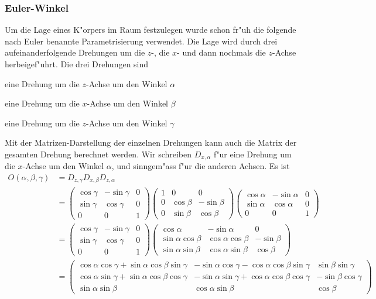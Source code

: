 \subsubsection{Euler-Winkel}
Um die Lage eines K"orpers im Raum festzulegen wurde schon fr"uh
die folgende nach Euler benannte  Parametrisierung verwendet.
Die Lage wird durch drei aufeinanderfolgende Drehungen um die $z$-,
die $x$- und dann nochmals die $z$-Achse herbeigef"uhrt. Die drei
Drehungen sind
\begin{compactenum}
\item eine Drehung um die $z$-Achse um den Winkel $\alpha$
\item eine Drehung um die $x$-Achse um den Winkel $\beta$
\item eine Drehung um die $z$-Achse um den Winkel $\gamma$
\end{compactenum}
Mit der Matrizen-Darstellung der einzelnen Drehungen kann auch
die Matrix der gesamten Drehung berechnet werden. Wir schreiben
$D_{x,\alpha}$ f"ur eine Drehung um die $x$-Achse um den Winkel
$\alpha$, und sinngem"ass f"ur die anderen Achsen.
Es ist
\begin{align*}
O(\alpha,\beta,\gamma)
&=
D_{z,\gamma}
D_{x,\beta}
D_{z,\alpha}
\\
&=
\begin{pmatrix}
\cos\gamma&-\sin\gamma&0\\
\sin\gamma&\cos\gamma&0\\
0&0&1
\end{pmatrix}
\begin{pmatrix}
1&0&0\\
0&\cos\beta&-\sin\beta\\
0&\sin\beta&\cos\beta
\end{pmatrix}
\begin{pmatrix}
\cos\alpha&-\sin\alpha&0\\
\sin\alpha&\cos\alpha&0\\
0&0&1
\end{pmatrix}
\\
&=
\begin{pmatrix}
\cos\gamma&-\sin\gamma&0\\
\sin\gamma&\cos\gamma&0\\
0&0&1
\end{pmatrix}
\begin{pmatrix}
\cos\alpha&-\sin\alpha&0\\
\sin\alpha\cos\beta&\cos\alpha\cos\beta&-\sin\beta\\
\sin\alpha\sin\beta&\cos\alpha\sin\beta&\cos\beta
\end{pmatrix}
\\
&=
\begin{pmatrix}
\cos\alpha\cos\gamma+\sin\alpha\cos\beta\sin\gamma
        &-\sin\alpha\cos\gamma-\cos\alpha\cos\beta\sin\gamma
                &\sin\beta\sin\gamma\\
\cos\alpha\sin\gamma+\sin\alpha\cos\beta\cos\gamma
        &-\sin\alpha\sin\gamma+\cos\alpha\cos\beta\cos\gamma
                &-\sin\beta\cos\gamma\\
\sin\alpha\sin\beta&\cos\alpha\sin\beta&\cos\beta
\end{pmatrix}
\end{align*}
